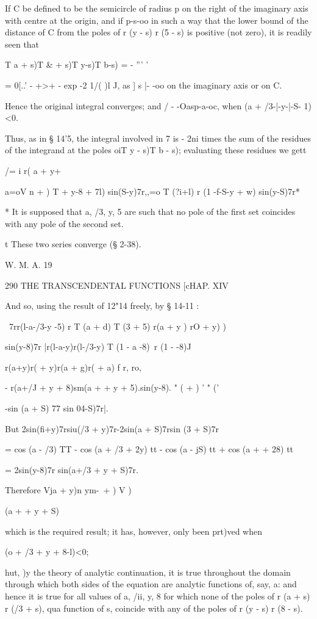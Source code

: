 If C be defined to be the semicircle of radius p on the right of the
imaginary axis with centre at the origin, and if p-s-oo in such a way
that the lower bound of the distance of C from the poles of r (y - s)
r (5 - s) is positive (not zero), it is readily seen that

T a + s)T \& + s)T y-s)T b-s) = - ''' '

= 0[..' - +>+ - exp -2 1/( )l J, as ] s |- -oo on the imaginary axis
or on C.

Hence the original integral converges; and / - -Oasp-a-oc, when (a +
/3-|-y-|-S- 1)<0.

Thus, as in § 14'5, the integral involved in 7 is - 2ni times the sum
of the residues of the integrand at the poles oiT y - s)T b - s);
evaluating these residues we gett

/= i r( a + y+%

a=oV n + ) T + y-8 + 7l) sin(S-y)7r,,=o T (?i+l) r (1 -f-S-y + w)
sin(y-S)7r*

* It is supposed that a, /3, y, 5 are such that no pole of the first
set coincides with any pole of the second set.

t These two series converge (§ 2-38).

W. M. A. 19

290 THE TRANSCENDENTAL FUNCTIONS [cHAP. XIV

And so, using the result of 12"14 freely, by § 14-11 :

\ 7rr(l-a-/3-y -5) r T (a + d) T (3 + 5) r(a + y ) rO + y) )

sin(y-8)7r |r(l-a-y)r(l-/3-y) T (1 - a -8)~r (1 - -8)J

r(a+y)r( + y)r(a + g)r( + a) f r, ro,

- r(a+/J + y + 8)sm(a + + y + 5).sin(y-8). " ( + ) ' " ('

-sin (a + S) 77 sin 04-S)7r|.

But 2sin(fi+y)7rsiu(/3 + y)7r-2sin(a + S)7rsin (3 + S)7r

= cos (a - /3) TT - cos (a + /3 + 2y) tt - cos (a - jS) tt + cos (a +
+ 28) tt

= 2sin(y-8)7r sin(a+/3 + y + S)7r.

Therefore Vja + y)n ym-\ + ) V )

 (a + + y + S)

which is the required result; it has, however, only been prt)ved when

 (o + /3 + y + 8-l)<0;

hut, )y the theory of analytic continuation, it is true throughout the
domain through which both sides of the equation are analytic functions
of, say, a: and hence it is true for all values of a, /ii, y, 8 for
which none of the poles of r (a + s) r (/3 + s), qua function of s,
coincide with any of the poles of r (y - s) r (8 - s).

